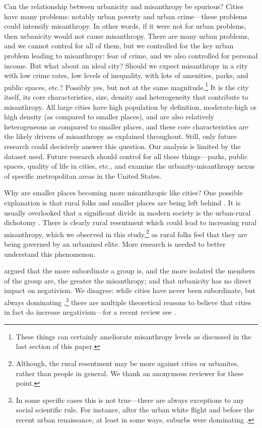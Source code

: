 \documentclass[11pt, letterpaper]{article}
\begin{document}
\begin{spacing}{1.4}
Can the relationship between urbanicity and misanthropy be spurious? Cities have many problems: notably urban poverty and urban crime---these problems could intensify misanthropy. In other words, if it were not for urban problems, then urbanicity would not cause misanthropy. There are many urban problems, and we cannot control for all of them, but we controlled for the key urban problem leading to misanthropy: fear of crime, and we also controlled for personal income. 
But what about an ideal city? Should we expect misanthropy in a city with low crime rates, low levels of inequality, with lots of amenities, parks, and public spaces, etc.? Possibly yes, but not at the same magnitude.\footnote{These things can certainly ameliorate misanthropy levels as discussed in the last section of this paper.} It is the city itself, its core characteristics, size, density and heterogeneity that contribute to misanthropy. All large cities have high population by definition, moderate-high or high density (as compared to smaller places), and are also relatively heterogeneous as compared to smaller places, and these core characteristics are the likely drivers of misanthropy as explained throughout.
%
Still, only future research could decisively  answer this question. Our analysis is limited by the dataset used. Future research should control for all these things---parks, public spaces, quality of life in cities, etc., and examine the urbanity-misanthropy nexus of specific metropolitan areas in the United States. 

Why are smaller places becoming more misanthropic like cities? One possible explanation is that rural folks and smaller places are being left behind \citep{aokCityBook15}. It is usually overlooked that a significant divide in modern society is the urban-rural dichotomy \citep{hansonCityJournalautumn15,hansonCJ17winter17}. There is clearly rural resentment which could lead to increasing rural misanthropy, which we observed in this study,\footnote{Although, the rural resentment may be more against cities or urbanites, rather than people in general. We thank an anonymous reviewer for these point.} as rural folks feel that they are being governed by an urbanized elite. More research is needed to better understand this phenomenon.

\citet{smith97} argued that the more subordinate a group is, and the more isolated the members of the group are, the greater the misanthropy; and that urbanicity has no direct impact on negativism.  %
We disagree: while cities have never been subordinate, but always dominating \citep[e.g.,][]{aok-sizeFetish17},\footnote{In some specific cases this is not
   true---there are always exceptions to any social scientific rule. For instance, after the urban white flight and before the recent urban renaissance, at least in some ways, suburbs were dominating \citep[e.g.,][]{adams14}.} there are multiple theoretical reasons to believe that cities in fact do increase negativism---for a recent review see \citet{aokCityBook15}. 
   

\end{spacing}
\end{document}

